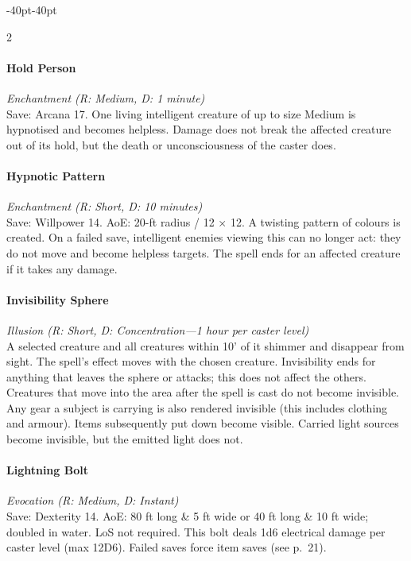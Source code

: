 \documentclass{book}
\begin{document}
\begin{adjustwidth}{-40pt}{-40pt}
\begin{multicols}{2}
\paragraph{Hold Person}\label{hold-person}

\emph{Enchantment (R: Medium, D: 1 minute)}\\
Save: Arcana 17. One living intelligent creature of up to size Medium is
hypnotised and becomes helpless. Damage does not break the affected
creature out of its hold, but the death or unconsciousness of the caster
does.

\paragraph{Hypnotic Pattern}\label{hypnotic-pattern}

\emph{Enchantment (R: Short, D: 10 minutes)}\\
Save: Willpower 14. AoE: 20-ft radius / 12 × 12. A twisting pattern of
colours is created. On a failed save, intelligent enemies viewing this
can no longer act: they do not move and become helpless targets. The
spell ends for an affected creature if it takes any damage.

\paragraph{Invisibility Sphere}\label{invisibility-sphere}

\emph{Illusion (R: Short, D: Concentration---1 hour per caster level)}\\
A selected creature and all creatures within 10' of it shimmer and
disappear from sight. The spell's effect moves with the chosen creature.
Invisibility ends for anything that leaves the sphere or attacks; this
does not affect the others. Creatures that move into the area after the
spell is cast do not become invisible. Any gear a subject is carrying is
also rendered invisible (this includes clothing and armour). Items
subsequently put down become visible. Carried light sources become
invisible, but the emitted light does not.

\paragraph{Lightning Bolt}\label{lightning-bolt}

\emph{Evocation (R: Medium, D: Instant)}\\
Save: Dexterity 14. AoE: 80 ft long \& 5 ft wide or 40 ft long \& 10 ft
wide; doubled in water. LoS not required. This bolt deals 1d6 electrical
damage per caster level (max 12D6). Failed saves force item saves (see
p.~21).


\end{multicols}
\end{adjustwidth}
\end{document}

